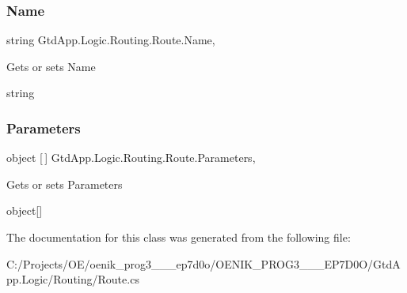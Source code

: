 \subsubsection{\texorpdfstring{Name}{Name}}
{\footnotesize\ttfamily string Gtd\+App.\+Logic.\+Routing.\+Route.\+Name\hspace{0.3cm}{\ttfamily [get]}, {\ttfamily [set]}}



Gets or sets Name 

string\mbox{\label{class_gtd_app_1_1_logic_1_1_routing_1_1_route_a4a18d7b4d6a44c38aece6553cbd50522}} 
\subsubsection{\texorpdfstring{Parameters}{Parameters}}
{\footnotesize\ttfamily object \mbox{[}$\,$\mbox{]} Gtd\+App.\+Logic.\+Routing.\+Route.\+Parameters\hspace{0.3cm}{\ttfamily [get]}, {\ttfamily [set]}}



Gets or sets Parameters 

object\mbox{[}\mbox{]}

The documentation for this class was generated from the following file\+:\begin{DoxyCompactItemize}
\item 
C\+:/\+Projects/\+O\+E/oenik\+\_\+prog3\+\_\+\_\+\_\+ep7d0o/\+O\+E\+N\+I\+K\+\_\+\+P\+R\+O\+G3\+\_\+\_\+\_\+\+E\+P7\+D0\+O/\+Gtd\+App.\+Logic/\+Routing/Route.\+cs\end{DoxyCompactItemize}
